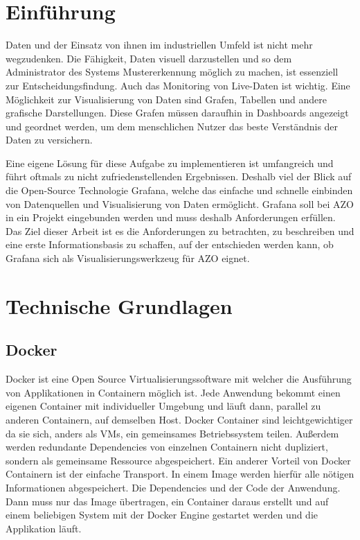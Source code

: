 \documentclass[a4paper, 12pt, oneside]{scrbook}
\begin{document}
	\frontmatter
	
	\tableofcontents
	\listoffigures
	\nocite{*}

	\mainmatter

	\pagebreak
	\chapter{Einführung}
	
	
	\noindent Daten und der Einsatz von ihnen im industriellen Umfeld ist nicht mehr wegzudenken. Die Fähigkeit, Daten visuell darzustellen und so dem Administrator des Systems Mustererkennung möglich zu machen, ist essenziell zur Entscheidungsfindung. Auch das Monitoring von Live-Daten ist wichtig. 
	Eine Möglichkeit zur Visualisierung von Daten sind Grafen, Tabellen und andere grafische Darstellungen. Diese Grafen müssen daraufhin in Dashboards angezeigt und geordnet werden, um dem menschlichen Nutzer das beste Verständnis der Daten zu versichern.
	
	\noindent Eine eigene Lösung für diese Aufgabe zu implementieren ist umfangreich und führt oftmals zu nicht zufriedenstellenden Ergebnissen. Deshalb viel der Blick auf die Open-Source Technologie Grafana, welche das einfache und schnelle einbinden von Datenquellen und Visualisierung von Daten ermöglicht. Grafana soll bei AZO in ein Projekt eingebunden werden und muss deshalb Anforderungen erfüllen. Das Ziel dieser Arbeit ist es die Anforderungen zu betrachten, zu beschreiben und eine erste Informationsbasis zu schaffen, auf der entschieden werden kann, ob Grafana sich als Visualisierungswerkzeug für AZO eignet.
		
	\chapter{Technische Grundlagen}
	
		\section{Docker}
			\noindent Docker ist eine Open Source Virtualisierungssoftware mit welcher die Ausführung von Applikationen in Containern möglich ist. Jede Anwendung bekommt einen eigenen Container mit individueller Umgebung und läuft dann, parallel zu anderen Containern, auf demselben Host. Docker Container sind leichtgewichtiger da sie sich, anders als VMs, ein gemeinsames Betriebssystem teilen. Außerdem werden redundante Dependencies von einzelnen Containern nicht dupliziert, sondern als gemeinsame Ressource abgespeichert. Ein anderer Vorteil von Docker Containern ist der einfache Transport. In einem Image werden hierfür alle nötigen Informationen abgespeichert. Die Dependencies und der Code der Anwendung. Dann muss nur das Image übertragen, ein Container daraus erstellt und auf einem beliebigen System mit der Docker Engine gestartet werden und die Applikation läuft.
			
\end{document}
